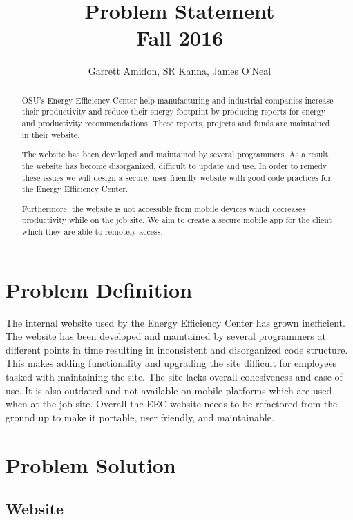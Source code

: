 \documentclass[letterpaper,10pt,titlepage,draftclsnofoot,onecolumn]{IEEEtran}
\title{Problem Statement \\
	\large Fall 2016}
\author{Garrett Amidon, SR Kanna, James O'Neal}
\begin{document}
\begin{titlingpage}
    \maketitle
	\centering{}
    \begin{abstract}
        OSU’s Energy Efficiency Center help manufacturing and industrial companies increase their productivity and reduce their energy footprint by producing reports for energy and productivity recommendations. These reports, projects and funds are maintained in their website.\newline

		The website has been developed and maintained by several programmers. As a result, the website has become disorganized, difficult to update and use. In order to remedy these issues we will design a secure, user friendly website with good code practices for the Energy Efficiency Center.\newline

		Furthermore, the website is not accessible from mobile devices which decreases productivity while on the job site. We aim to create a secure mobile app for the client which they are able to remotely access.
    \end{abstract}
\end{titlingpage}
\section{Problem Definition}

The internal website used by the Energy Efficiency Center has grown inefficient. The website has been developed and maintained by several programmers at different points in time resulting in inconsistent and disorganized code structure. This makes adding functionality and upgrading the site difficult for employees tasked with maintaining the site. The site lacks overall cohesiveness and ease of use. It  is also outdated and not available on mobile platforms which are used when at the job site. Overall the EEC website needs to be refactored from the ground up to make it portable, user friendly, and maintainable. 

\section{Problem Solution}

\subsection{Website}
\end{document}
